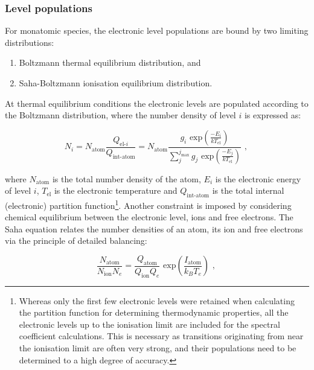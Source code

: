 \subsubsection{Level populations}

For monatomic species, the electronic level populations are bound by two limiting distributions:

\begin{enumerate}
 \item Boltzmann thermal equilibrium distribution, and
 \item Saha-Boltzmann ionisation equilibrium distribution.
\end{enumerate}

At thermal equilibrium conditions the electronic levels are populated according to the Boltzmann distribution, where the number density of level $i$ is expressed as:

\begin{equation}
 N_i = N_\text{atom} \frac{ Q_{\text{el-}i} }{ Q_\text{int-atom} } = N_\text{atom} \frac{g_i \text{~exp} \left ( \frac{-E_i}{kT_\text{el}} \right )}{\sum_j^{j_\text{max}} g_j \text{~exp} \left ( \frac{-E_j}{kT_\text{el}} \right )} \text{ , } \label{eq:atom_boltz}
\end{equation}

\noindent where $N_\text{atom}$ is the total number density of the atom, $E_i$ is the electronic energy of level $i$, $T_\text{el}$ is the electronic temperature and $Q_\text{int-atom}$ is the total internal (electronic) partition function\footnote{Whereas only the first few electronic levels were retained when calculating the partition function for determining thermodynamic properties, all the electronic levels up to the ionisation limit are included for the spectral coefficient calculations.  This is necessary as transitions originating from near the ionisation limit are often very strong, and their populations need to be determined to a high degree of accuracy.}.
Another constraint is imposed by considering chemical equilibrium between the electronic level, ions and free electrons.
The Saha equation relates the number densities of an atom, its ion and free electrons via the principle of detailed balancing:

\begin{equation}
 \frac{ N_\text{atom} }{ N_\text{ion} N_e } = \frac{ Q_\text{atom} }{ Q_\text{ion} Q_e } \text{~exp} \left ( \frac{I_\text{atom}}{k_B T_e} \right ) \text{ , } \label{eq:atom_saha}
\end{equation}

